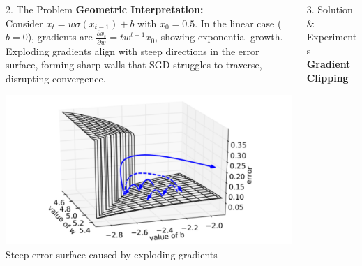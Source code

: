 \begin{frame}[t]
\begin{columns}[t,totalwidth=\textwidth]
\begin{column}{0.33\textwidth}
\begin{block}{2. The Problem}
    \vspace{0.5em}
    \textbf{Geometric Interpretation:} \\
    Consider $x_t = w\sigma(x_{t-1}) + b$ with $x_0 = 0.5$. In the linear case ($b = 0$), gradients are $\frac{\partial x_t}{\partial w} = t w^{t-1} x_0$, showing exponential growth. Exploding gradients align with steep directions in the error surface, forming sharp walls that SGD struggles to traverse, disrupting convergence.

    \begin{center}
        \includegraphics[width=0.9\linewidth]{figures/geometric.png} \\
        \small Steep error surface caused by exploding gradients
    \end{center}

    \end{block}
\end{column}



    \begin{column}{0.33\textwidth}
    \begin{block}{3. Solution \& Experiments}
        \textbf{Gradient Clipping}
        
        \vspace{-2em}
    

\end{block}
\end{column}
\end{columns}
\end{frame}

